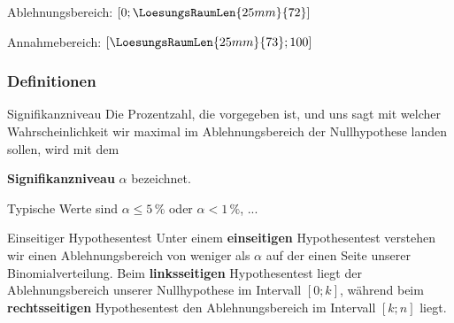 

Ablehnungsbereich: $[0; \LoesungsRaumLen{25mm}{72}]$


Annahmebereich:  $[\LoesungsRaumLen{25mm}{73}; 100]$



\newpage

\subsubsection*{Definitionen}

\begin{definition}{Signifikanzniveau}{}
  Die Prozentzahl, die vorgegeben ist, und uns sagt mit welcher Wahrscheinlichkeit wir maximal im Ablehnungsbereich der Nullhypothese landen sollen, wird mit dem

  \begin{center}\textbf{Signifikanzniveau} $\alpha$ bezeichnet.\end{center}

  Typische Werte sind $\alpha \le 5\,\%$ oder $\alpha < 1\,\%$, ...
\end{definition}



\begin{definition}{Einseitiger Hypothesentest}{}
Unter einem \textbf{einseitigen} Hypothesentest verstehen wir einen Ablehnungsbereich von weniger als $\alpha$ auf der einen Seite unserer Binomialverteilung. Beim \textbf{linksseitigen} Hypothesentest liegt der Ablehnungsbereich unserer Nullhypothese im Intervall $[0; k]$, während beim \textbf{rechtsseitigen} Hypothesentest den Ablehnungsbereich im Intervall $[k;n]$ liegt.
  \end{definition}


\newpage
